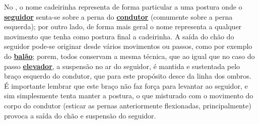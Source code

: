 \caracterpostura{\CheckedItem}{\NoCheckedItem}
No \AnoLivro, o nome cadeirinha representa de forma particular a uma postura onde o \hyperref[def:Seguidor]{\textbf{seguidor}} 
senta-se sobre a perna do \hyperref[def:Condutor]{\textbf{condutor}}  (comumente sobre a perna esquerda);
por outro lado, de forma mais geral  o nome representa a qualquer movimento que tenha como postura final a cadeirinha.
A saída do chão do seguidor pode-se originar desde vários movimentos ou passos,
como por exemplo do  \hyperref[def:PassoBalao]{\textbf{balão}}; porem,
todos conservam a mesma técnica, que ao igual que  no caso do passo  \hyperref[def:PassoElevador]{\textbf{elevador}},
a suspensão no ar do seguidor, é mantida e sustentada pelo braço esquerdo do condutor,
que para este propósito  desce da linha dos ombros.
É importante lembrar que este braço não faz força para levantar ao seguidor, 
e sim simplesmente tenta manter a postura,
o que misturado com o movimento do corpo do condutor (esticar as pernas anteriormente flexionadas, principalmente)
provoca a saída do chão e suspensão do seguidor.

